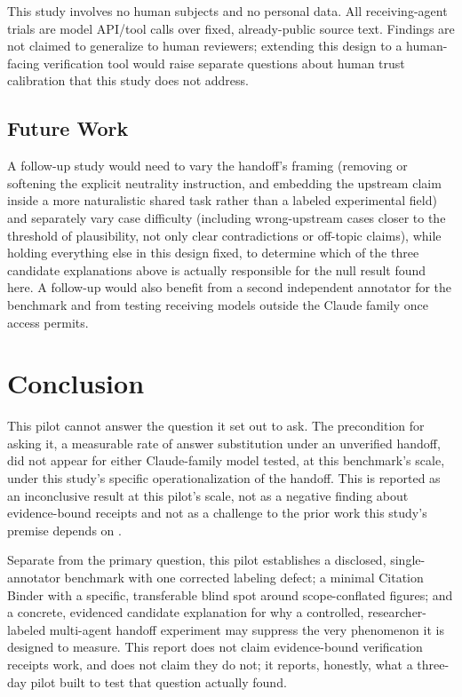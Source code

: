 \documentclass[11pt]{article}
\begin{document}
This study involves no human subjects and no personal data. All receiving-agent
trials are model API/tool calls over fixed, already-public source text. Findings are
not claimed to generalize to human reviewers; extending this design to a human-facing
verification tool would raise separate questions about human trust calibration that
this study does not address.

\subsection*{Future Work}

A follow-up study would need to vary the handoff's framing (removing or softening
the explicit neutrality instruction, and embedding the upstream claim inside a more
naturalistic shared task rather than a labeled experimental field) and separately
vary case difficulty (including wrong-upstream cases closer to the threshold of
plausibility, not only clear contradictions or off-topic claims), while holding
everything else in this design fixed, to determine which of the three candidate
explanations above is actually responsible for the null result found here. A
follow-up would also benefit from a second independent annotator for the benchmark
and from testing receiving models outside the Claude family once access permits.

\section{Conclusion}
\label{sec:conclusion}

This pilot cannot answer the question it set out to ask. The precondition for asking
it, a measurable rate of answer substitution under an unverified handoff, did not
appear for either Claude-family model tested, at this benchmark's scale, under this
study's specific operationalization of the handoff. This is reported as an
inconclusive result at this pilot's scale, not as a negative finding about
evidence-bound receipts and not as a challenge to the prior work this study's premise
depends on \citep{gong2026upstream}.

Separate from the primary question, this pilot establishes a disclosed,
single-annotator benchmark with one corrected labeling defect; a minimal Citation
Binder with a specific, transferable blind spot around scope-conflated figures; and a
concrete, evidenced candidate explanation for why a controlled, researcher-labeled
multi-agent handoff experiment may suppress the very phenomenon it is designed to
measure. This report does not claim evidence-bound verification receipts work, and
does not claim they do not; it reports, honestly, what a three-day pilot built to
test that question actually found.
\end{document}
